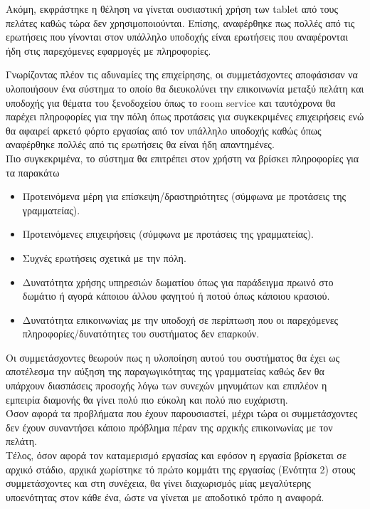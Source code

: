 \noindent
Ακόμη, εκφράστηκε η θέληση να γίνεται ουσιαστική χρήση των tablet από τους πελάτες καθώς τώρα δεν χρησιμοποιούνται. Επίσης, αναφέρθηκε πως πολλές από τις ερωτήσεις που γίνονται στον υπάλληλο υποδοχής είναι ερωτήσεις που αναφέρονται ήδη στις παρεχόμενες εφαρμογές με πληροφορίες.

\newpage
\noindent
Γνωρίζοντας πλέον τις αδυναμίες της επιχείρησης, οι συμμετάσχοντες αποφάσισαν να υλοποιήσουν ένα σύστημα το οποίο θα διευκολύνει την επικοινωνία μεταξύ πελάτη και υποδοχής για θέματα του ξενοδοχείου όπως το room service και ταυτόχρονα θα παρέχει πληροφορίες για την πόλη όπως προτάσεις για συγκεκριμένες επιχειρήσεις ενώ θα αφαιρεί αρκετό φόρτο εργασίας από τον υπάλληλο υποδοχής καθώς όπως αναφέρθηκε πολλές από τις ερωτήσεις θα είναι ήδη απαντημένες.\\

\noindent
Πιο συγκεκριμένα, το σύστημα θα επιτρέπει στον χρήστη να βρίσκει πληροφορίες για τα παρακάτω
\begin{itemize}
	\item Προτεινόμενα μέρη για επίσκεψη/δραστηριότητες (σύμφωνα με προτάσεις της γραμματείας).
	\item Προτεινόμενες επιχειρήσεις (σύμφωνα με προτάσεις της γραμματείας).
	\item Συχνές ερωτήσεις σχετικά με την πόλη.
	\item Δυνατότητα χρήσης υπηρεσιών δωματίου όπως για παράδειγμα πρωινό στο δωμάτιο ή αγορά κάποιου άλλου φαγητού ή ποτού όπως κάποιου κρασιού.
	\item Δυνατότητα επικοινωνίας με την υποδοχή σε περίπτωση που οι παρεχόμενες πληροφορίες/δυνατότητες του συστήματος δεν επαρκούν.
\end{itemize} 

\noindent
Οι συμμετάσχοντες θεωρούν πως η υλοποίηση αυτού του συστήματος θα έχει ως αποτέλεσμα την αύξηση της παραγωγικότητας της γραμματείας καθώς δεν θα υπάρχουν διασπάσεις προσοχής λόγω των συνεχών μηνυμάτων και επιπλέον η εμπειρία διαμονής θα γίνει πολύ πιο εύκολη και πολύ πιο ευχάριστη.\\ 

\noindent
Όσον αφορά τα προβλήματα που έχουν παρουσιαστεί, μέχρι τώρα οι συμμετάσχοντες δεν έχουν συναντήσει κάποιο πρόβλημα πέραν της αρχικής επικοινωνίας με τον πελάτη.\\

\noindent
Τέλος, όσον αφορά τον καταμερισμό εργασίας και εφόσον η εργασία βρίσκεται σε αρχικό στάδιο, αρχικά χωρίστηκε τό πρώτο κομμάτι της εργασίας (Ενότητα 2) στους συμμετάσχοντες και στη συνέχεια, θα γίνει διαχωρισμός μίας μεγαλύτερης υποενότητας στον κάθε ένα, ώστε να γίνεται με αποδοτικό τρόπο η αναφορά.